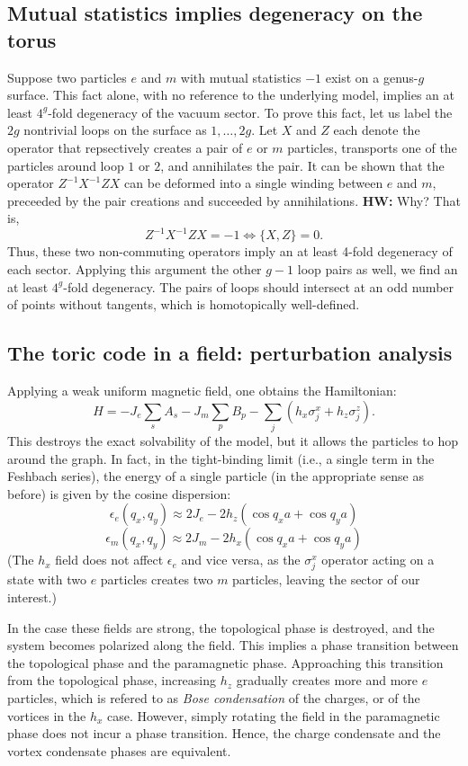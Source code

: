 \documentclass{article}
\newcommand{\hwnote}[1]{{\color{red}\textbf{HW:} #1}}
\begin{document}
\subsection{Mutual statistics implies degeneracy on the torus}
Suppose two particles $e$ and $m$ with mutual statistics $-1$ exist on a genus-$g$ surface.
This fact alone, with no reference to the underlying model,
implies an at least $4^g$-fold degeneracy of the vacuum sector.
To prove this fact, let us label the $2g$ nontrivial loops on the surface as $1, \dots, 2g$.
Let $X$ and $Z$ each denote the operator that repsectively creates a pair of $e$ or $m$ particles,
transports one of the particles around loop $1$ or $2$, and annihilates the pair.
It can be shown that the operator $Z^{-1}X^{-1}ZX$
can be deformed into a single winding between $e$ and $m$,
preceeded by the pair creations and succeeded by annihilations.
\hwnote{Why?}
That is,
\[
    Z^{-1}X^{-1}ZX = -1 \Leftrightarrow \{X,Z\} = 0.
\]
Thus, these two non-commuting operators imply an at least 4-fold degeneracy of each sector.
Applying this argument the other $g-1$ loop pairs as well,
we find an at least $4^g$-fold degeneracy.
The pairs of loops should intersect at an odd number of points without tangents,
which is homotopically well-defined.

\subsection{The toric code in a field: perturbation analysis}
Applying a weak uniform magnetic field, one obtains the Hamiltonian:
\[
    H = -J_e \sum_s A_s - J_m \sum_p B_p - \sum_j (h_x \sigma_j^x + h_z \sigma_j^z).
\]
This destroys the exact solvability of the model, but it allows the particles to hop around the graph.
In fact, in the tight-binding limit (i.e., a single term in the Feshbach series),
the energy of a single particle (in the appropriate sense as before)
is given by the cosine dispersion:
\[
    \epsilon_e(q_x, q_y) \approx 2J_e - 2h_z (\cos q_x a + \cos q_y a)
\]
\[
    \epsilon_m(q_x, q_y) \approx 2J_m - 2h_x (\cos q_x a + \cos q_y a)
\]
(The $h_x$ field does not affect $\epsilon_e$ and vice versa,
as the $\sigma_j^x$ operator acting on a state with two $e$ particles
creates two $m$ particles, leaving the sector of our interest.)

In the case these fields are strong, the topological phase is destroyed,
and the system becomes polarized along the field.
This implies a phase transition between the topological phase and the paramagnetic phase.
Approaching this transition from the topological phase,
increasing $h_z$ gradually creates more and more $e$ particles,
which is refered to as \emph{Bose condensation} of the charges,
or of the vortices in the $h_x$ case.
However, simply rotating the field in the paramagnetic phase does not incur a phase transition.
Hence, the charge condensate and the vortex condensate phases are equivalent.
\end{document}
